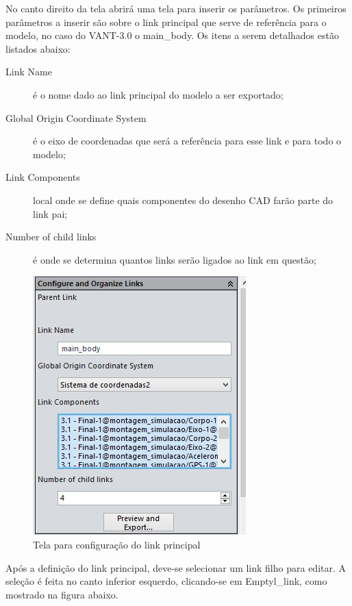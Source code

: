 No canto direito da tela abrirá uma tela para inserir os parâmetros. Os primeiros parâmetros a inserir são sobre o link principal que serve de referência para o modelo, no caso do VANT-3.0 o main\_body. Os itens a serem detalhados estão listados abaixo:

\begin{description}
\item [Link Name] é o nome dado ao link principal do modelo a ser exportado;
\item [Global Origin Coordinate System] é o eixo de coordenadas que será a referência para esse link e para todo o modelo; 
\item [Link Components] local onde se define quais componentes do desenho CAD farão parte do link pai; 
\item [Number of child links] é onde se determina quantos links serão ligados ao link em questão;
\end{description}

\begin{figure}[!htb]%
\centering %
\includegraphics[scale=1]{Imagens/main_body.jpg} %
\caption{Tela para configuração do link principal} %
\end{figure} %

Após a definição do link principal, deve-se selecionar um link filho para editar. A seleção é feita no canto inferior esquerdo, clicando-se em Emptyl\_link, como mostrado na figura abaixo.

